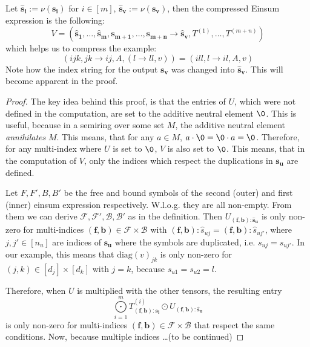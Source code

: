 \begin{theorem}
    Let $\bm{\hat{s}_i} := \nu(\bm{s_i})$ for $i \in [m]$, $\bm{\hat{s}_v} := \nu(\bm{s_v})$, then the compressed Einsum expression is the following:
    $$V = (\bm{\hat{s}_1},\dots,\bm{\hat{s}_m}, \bm{s_{m + 1}}, \dots, \bm{s_{m + n}} \rightarrow \bm{\hat{s}_v}, T^{(1)},\dots,T^{(m + n)})$$
    which helps us to compress the example:
    $$(ijk, jk \rightarrow ij, A, (l \rightarrow ll, v)) = (ill, l \rightarrow il, A, v)$$
    Note how the index string for the output $\bm{s_v}$ was changed into $\bm{\hat{s}_v}$.
    This will become apparent in the proof.
\end{theorem}

\begin{proof}
    \small
    The key idea behind this proof, is that the entries of $U$, which were not defined in the computation, are set to the additive neutral element $\0$.
    This is useful, because in a semiring over some set $M$, the additive neutral element \textit{annihilates} $M$.
    This means, that for any $a \in M$, $a \cdot \0 = \0 \cdot a = \0$.
    Therefore, for any multi-index where $U$ is set to $\0$, $V$ is also set to $\0$.
    This means, that in the computation of $V$, only the indices which respect the duplications in $\bm{s_u}$ are defined.

    Let $F, F', B, B'$ be the free and bound symbols of the second (outer) and first (inner) einsum expression respectively.
    W.l.o.g. they are all non-empty.
    From them we can derive $\mathcal{F}, \mathcal{F}', \mathcal{B}, \mathcal{B}'$ as in the definition.
    Then $U_{(\bm{f}, \bm{b}): \bm{\hat{s}_u}}$ is only non-zero for multi-indices $(\bm{f}, \bm{b}) \in \mathcal{F} \times \mathcal{B}$ with $(\bm{f}, \bm{b}):\hat{s}_{uj} = (\bm{f}, \bm{b}):\hat{s}_{uj'}$, where $j,j' \in [n_u]$ are indices of $\bm{s_u}$ where the symbols are duplicated, i.e. $s_{uj} = s_{uj'}$.
    In our example, this means that $\text{diag}(v)_{jk}$ is only non-zero for $(j,k) \in [d_j] \times [d_k]$ with $j = k$, because $s_{u1} = s_{u2} = l$.

    Therefore, when $U$ is multiplied with the other tensors, the resulting entry
    $$\bigodot\limits_{i = 1}^{m} T^{(i)}_{(\bm{f}, \bm{b}): \bm{s_i}} \odot U_{(\bm{f}, \bm{b}): \bm{\hat{s}_u}}$$
    is only non-zero for multi-indices $(\bm{f}, \bm{b}) \in \mathcal{F} \times \mathcal{B}$ that respect the same conditions.
    Now, because multiple indices \dots (to be continued)


\end{proof}
